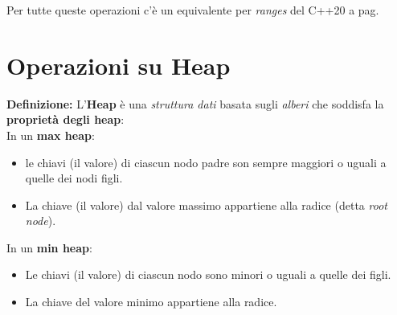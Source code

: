 \fleuron

\textsf{\small Per tutte queste operazioni c'è un equivalente per \emph{ranges} del C++20 a pag. \pageref{ranges_set}} \\


\newpage

\section{Operazioni su Heap}

\textsf{\small \textbf{Definizione: } L'\textbf{Heap} è una \emph{struttura dati} basata sugli \emph{alberi} che soddisfa la \textbf{proprietà degli heap}: } \\

\textsf{\small In un \textbf{max heap}: } \\

\begin{itemize}
	\item \textsf{\small le chiavi (il valore) di ciascun nodo padre son sempre maggiori o uguali a quelle dei nodi figli.}
	\item \textsf{\small La chiave (il valore) dal valore massimo appartiene alla radice (detta \emph{root node}).}
\end{itemize}

\textsf{\small In un \textbf{min heap}: } \\

\begin{itemize}
	\item \textsf{\small Le chiavi (il valore) di ciascun nodo sono minori o uguali a quelle dei figli.}
	\item \textsf{\small La chiave del valore minimo appartiene alla radice. }
\end{itemize}

